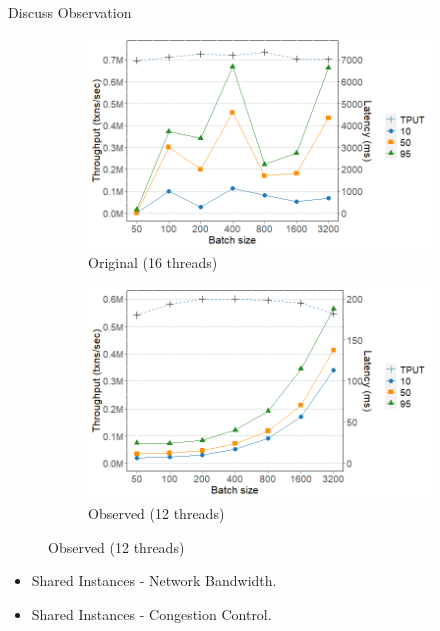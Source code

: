 \documentclass[xcolor=dvipsnames]{beamer}
\begin{document}
    \begin{frame}{Discuss Observation}
    
        \begin{figure}
            \begin{subfigure}[h]{0.4\linewidth}
                \includegraphics[scale=0.28]{fig16_16t.png}
                \caption{Original (16 threads)}
            \end{subfigure}
            \hfill
            \begin{subfigure}[h]{0.5\linewidth}
                \includegraphics[scale=0.28]{fig16_12t.png}
                \caption{Observed (12 threads)}
            \end{subfigure}
        \end{figure}

        \begin{itemize}
            \item Shared Instances - Network Bandwidth.
            \item Shared Instances - Congestion Control.
        \end{itemize}

    \end{frame}
\end{document}
